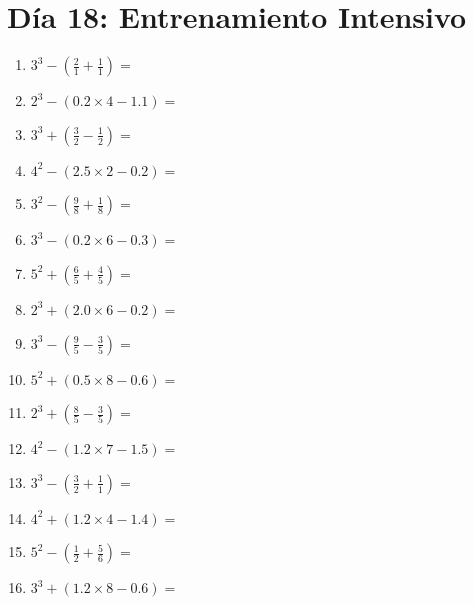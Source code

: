 \documentclass[12pt]{article}
\begin{document}
\section*{Día 18: Entrenamiento Intensivo}
\begin{enumerate}
\item \large $ 3^{3} - (\frac{2}{1} + \frac{1}{1}) = $ \vspace{1.6cm}
\item \large $ 2^{3} - (0.2 \times 4 - 1.1) = $ \vspace{1.6cm}
\item \large $ 3^{3} + (\frac{3}{2} - \frac{1}{2}) = $ \vspace{1.6cm}
\item \large $ 4^{2} - (2.5 \times 2 - 0.2) = $ \vspace{1.6cm}
\item \large $ 3^{2} - (\frac{9}{8} + \frac{1}{8}) = $ \vspace{1.6cm}
\item \large $ 3^{3} - (0.2 \times 6 - 0.3) = $ \vspace{1.6cm}
\item \large $ 5^{2} + (\frac{6}{5} + \frac{4}{5}) = $ \vspace{1.6cm}
\item \large $ 2^{3} + (2.0 \times 6 - 0.2) = $ \vspace{1.6cm}
\item \large $ 3^{3} - (\frac{9}{5} - \frac{3}{5}) = $ \vspace{1.6cm}
\item \large $ 5^{2} + (0.5 \times 8 - 0.6) = $ \vspace{1.6cm}
\newpage
\item \large $ 2^{3} + (\frac{8}{5} - \frac{3}{5}) = $ \vspace{1.6cm}
\item \large $ 4^{2} - (1.2 \times 7 - 1.5) = $ \vspace{1.6cm}
\item \large $ 3^{3} - (\frac{3}{2} + \frac{1}{1}) = $ \vspace{1.6cm}
\item \large $ 4^{2} + (1.2 \times 4 - 1.4) = $ \vspace{1.6cm}
\item \large $ 5^{2} - (\frac{1}{2} + \frac{5}{6}) = $ \vspace{1.6cm}
\item \large $ 3^{3} + (1.2 \times 8 - 0.6) = $ \vspace{1.6cm}

\end{enumerate}
\end{document}
